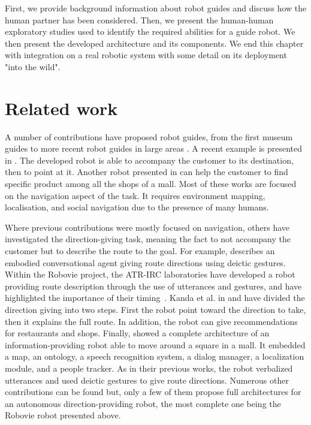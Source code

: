 First, we provide background information about robot guides and discuss how the human partner has been considered. Then, we present the human-human exploratory studies used to identify the required abilities for a guide robot. We then present the developed architecture and its components. We end this chapter with integration on a real robotic system with some detail on its deployment "into the wild".

\section{Related work}

A number of contributions have proposed robot guides, from the first museum guides \cite{burgard_1999_museum, siegwart_2003_robox, clodic_2006_rackham} to more recent robot guides in large areas \cite{bauer_2009_autonomous, triebel_2016_spencer}. A recent example is presented in \cite{chen_2017_robots}. The developed robot is able to accompany the customer to its destination, then to point at it. Another robot presented in \cite{gross_2009_toomas} can help the customer to find specific product among all the shops of a mall. Most of these works are focused on the navigation aspect of the task. It requires environment mapping, localisation, and social navigation due to the presence of many humans.

Where previous contributions were mostly focused on navigation, others have investigated the direction-giving task, meaning the fact to not accompany the customer but to describe the route to the goal. For example, \cite{cassell_2007_trading} describes an embodied conversational agent giving route directions using deictic gestures. Within the Robovie project, the ATR-IRC laboratories have developed a robot providing route description through the use of utterances and gestures, and have highlighted the importance of their timing~\cite{okuno_2009_providing}. Kanda et al. in \cite{kanda_2009_affective} and \cite{kanda_2010_communication} have divided the direction giving into two steps. First the robot point toward the direction to take, then it explains the full route. In addition, the robot can give recommendations for restaurants and shops. Finally, \cite{satake_2015_should} showed a complete architecture of an information-providing robot able to move around a square in a mall. It embedded a map, an ontology, a speech recognition system, a dialog manager, a localization module, and a people tracker. As in their previous works, the robot verbalized utterances and used deictic gestures to give route directions. Numerous other contributions can be found but, only a few of them propose full architectures for an autonomous direction-providing robot, the most complete one being the Robovie robot presented above. 

